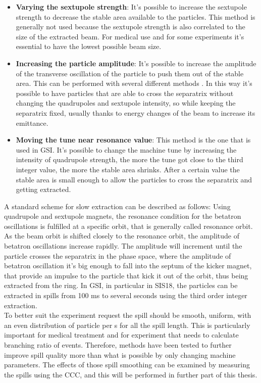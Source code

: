 \documentclass[12pt,a4paper]{report}
\begin{document}
	\begin{itemize}
		\item \textbf{Varying the sextupole strength}: It's possible to increase the sextupole strength to decrease the stable area available to the particles. This method is generally not used because the sextupole strength is also correlated to the size of the extracted beam. For medical use and for some experiments it's essential to have the lowest possible beam size.
		\item \textbf{Increasing the particle amplitude}: It's possible to increase the amplitude of the transverse oscillation of the particle to push them out of the stable area. This can be performed with several different methods \cite{Cern_slow_extraction}. In this way it's possible to have particles that are able to cross the separatrix without changing the quadrupoles and sextupole intensity, so while keeping the separatrix fixed, usually thanks to energy changes of the beam to increase its emittance.
		\item \textbf{Moving the tune near resonance value}: This method is the one that is used in GSI. It's possible to change the machine tune by increasing the intensity of quadrupole strength, the more the tune got close to the third integer value, the more the stable area shrinks. After a certain value the stable area is small enough to allow the particles to cross the separatrix and getting extracted.
	\end{itemize}
	A standard scheme for slow extraction can be described as follows: Using quadrupole and sextupole magnets, the resonance condition for the betatron oscillations is fulfilled at a specific orbit, that is generally called resonance orbit. As the beam orbit is shifted closely to the resonance orbit, the amplitude of betatron oscillations increase rapidly. The amplitude will increment until the particle crosses the separatrix in the phase space, where the amplitude of betatron oscillation it's big enough to fall into the septum of the kicker magnet, that provide an impulse to the particle that kick it out of the orbit, thus being extracted from the ring.
	In GSI, in particular in SIS18, the particles can be extracted in spills from 100 ms to several seconds using the third order integer extraction.\\
	To better suit the experiment request the spill should be smooth, uniform, with an even distribution of particle per s for all the spill length. This is particularly important for medical treatment and for experiment that needs to calculate branching ratio of events. Therefore, methods have been tested to further improve spill quality more than what is possible by only changing machine parameters. The effects of those spill smoothing can be examined by measuring the spills using the CCC, and this will be performed in further part of this thesis.
	
\end{document}
